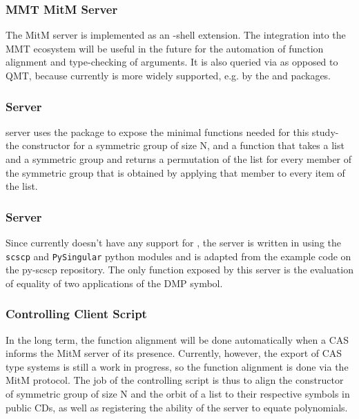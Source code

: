 \subsubsection{MMT MitM Server}
The MitM server is implemented as an \MMT-shell extension. The integration into the
MMT ecosystem will be useful in the future for the automation of function 
alignment and type-checking of arguments. It is also queried via \SCSCP as opposed 
to QMT, because currently \SCSCP is more widely supported, e.g. by the \GAP and 
\Python packages.

\subsubsection{\GAP \SCSCP Server}
\GAP server uses the \GAP \SCSCP package to expose the minimal functions needed for 
this study- the constructor for a symmetric group of size N, and a function that
takes a list and a symmetric group and returns a permutation of the list for every 
member of the symmetric group that is obtained by applying that member to every
item of the list.

\subsubsection{\Singular \SCSCP Server}
Since \Singular currently doesn't have any support for \SCSCP, the \Singular \SCSCP server is
written in \Python using the \lstinline|scscp| and \lstinline|PySingular| python modules
and is adapted from the example code on the py-scscp repository\cite{PySCSCP}. The only
function exposed by this server is the evaluation of equality of two applications of the
DMP symbol.

\subsubsection{Controlling Client Script}
In the long term, the function alignment will be done automatically when a CAS 
informs the MitM server of its presence. Currently, however, the export of CAS 
type systems is still a work in progress, so the function alignment is done
via the MitM protocol. The job of the controlling script is thus to align the 
constructor of symmetric group of size N and the orbit of a list to their 
respective symbols in public CDs, as well as registering the ability of the 
\Singular server to equate polynomials.

